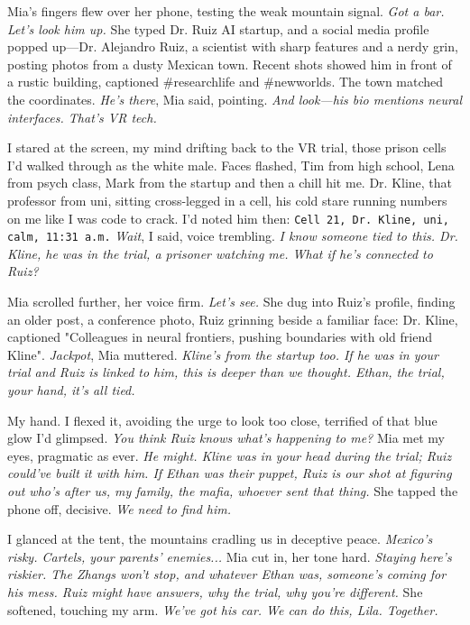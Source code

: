 \documentclass[12pt,oneside]{book} %
\newcommand{\note}[1]{\texttt{#1}}
\begin{document}
Mia’s fingers flew over her phone, testing the weak mountain signal. \textit{Got a bar. Let’s look him up.} She typed \textnormal{Dr. Ruiz AI startup}, and a social media profile popped up—Dr. Alejandro Ruiz, a scientist with sharp features and a nerdy grin, posting photos from a dusty Mexican town. Recent shots showed him in front of a rustic building, captioned \textnormal{\#researchlife} and \textnormal{\#newworlds}. The town matched the coordinates. \textit{He’s there}, Mia said, pointing. \textit{And look—his bio mentions neural interfaces. That’s VR tech.}

I stared at the screen, my mind drifting back to the VR trial, those prison cells I’d walked through as the white male. Faces flashed, Tim from high school, Lena from psych class, Mark from the startup and then a chill hit me. Dr. Kline, that professor from uni, sitting cross-legged in a cell, his cold stare running numbers on me like I was code to crack. I’d noted him then: \note{Cell 21, Dr. Kline, uni, calm, 11:31 a.m.} \textit{Wait}, I said, voice trembling. \textit{I know someone tied to this. Dr. Kline, he was in the trial, a prisoner watching me. What if he’s connected to Ruiz?}

Mia scrolled further, her voice firm. \textit{Let’s see.} She dug into Ruiz’s profile, finding an older post, a conference photo, Ruiz grinning beside a familiar face: Dr. Kline, captioned \textnormal{"Colleagues in neural frontiers, pushing boundaries with old friend Kline"}. \textit{Jackpot}, Mia muttered. \textit{Kline’s from the startup too. If he was in your trial and Ruiz is linked to him, this is deeper than we thought. Ethan, the trial, your hand, it’s all tied.}

My hand. I flexed it, avoiding the urge to look too close, terrified of that blue glow I’d glimpsed. \textit{You think Ruiz knows what’s happening to me?} Mia met my eyes, pragmatic as ever. \textit{He might. Kline was in your head during the trial; Ruiz could’ve built it with him. If Ethan was their puppet, Ruiz is our shot at figuring out who’s after us, my family, the mafia, whoever sent that thing.} She tapped the phone off, decisive. \textit{We need to find him.}

I glanced at the tent, the mountains cradling us in deceptive peace. \textit{Mexico’s risky. Cartels, your parents’ enemies...} Mia cut in, her tone hard. \textit{Staying here’s riskier. The Zhangs won’t stop, and whatever Ethan was, someone’s coming for his mess. Ruiz might have answers, why the trial, why you’re different.} She softened, touching my arm. \textit{We’ve got his car. We can do this, Lila. Together.}
\end{document}
